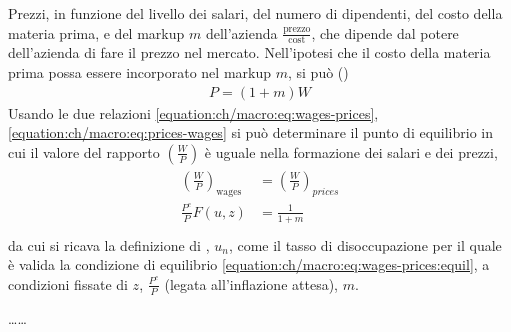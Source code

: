 \documentclass[letterpaper,10pt,italian]{jupyterBook}
\begin{document}
\sphinxAtStartPar
Prezzi, in funzione del livello dei salari, del numero di dipendenti, del costo della materia prima, e del markup \(m\) dell’azienda \(\frac{\text{prezzo}}{\text{cost}}\), che dipende dal potere dell’azienda di fare il prezzo nel mercato. Nell’ipotesi che il costo della materia prima possa essere incorporato nel markup \(m\), si può ()
\begin{equation}\label{equation:ch/macro:eq:prices-wages}
\begin{split}P = (1+m) W\end{split}
\end{equation}
\sphinxAtStartPar
Usando le due relazioni \eqref{equation:ch/macro:eq:wages-prices}, \eqref{equation:ch/macro:eq:prices-wages} si può determinare il punto di equilibrio in cui il valore del rapporto \(\left(\frac{W}{P} \right)\) è uguale nella formazione dei salari e dei prezzi,
\begin{equation}\label{equation:ch/macro:eq:wages-prices:equil}
\begin{split}\begin{aligned}
 \left( \frac{W}{P} \right)_{\text{wages}} & = \left( \frac{W}{P} \right)_{{prices}} \\
 \frac{P^e}{P} F(u, z) & = \frac{1}{1+m} \\
\end{aligned}\end{split}
\end{equation}
\sphinxAtStartPar
da cui si ricava la definizione di , \(u_n\), come il tasso di disoccupazione per il quale è valida la condizione di equilibrio \eqref{equation:ch/macro:eq:wages-prices:equil}, a condizioni fissate di \(z\), \(\frac{P^e}{P}\) (legata all’inflazione attesa), \(m\).

\sphinxAtStartPar
{}
……
\end{document}
